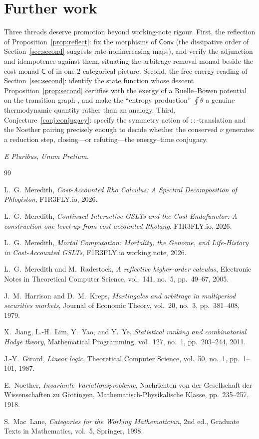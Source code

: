 \documentclass[11pt]{article}
\theoremstyle{definition}
\theoremstyle{plain}
\theoremstyle{remark}
\newcommand{\cost}{\mathsf{C}}
\newcommand{\Conv}{\mathsf{Conv}}
\begin{document}
\section*{Further work}

Three threads deserve promotion beyond working-note rigour.
First, the reflection of Proposition~\ref{prop:reflect}: fix the morphisms of $\Conv$ (the
dissipative order of Section~\ref{sec:second} suggests rate-nonincreasing maps), and verify the
adjunction and idempotence against them, situating the arbitrage-removal monad beside the cost
monad $\cost$ of \cite{CE} in one $2$-categorical picture.
Second, the free-energy reading of Section~\ref{sec:second}: identify the state function whose
descent Proposition~\ref{prop:second} certifies with the exergy of a Ruelle--Bowen potential on the
transition graph \cite{MC}, and make the ``entropy production'' $\oint\theta$ a genuine thermodynamic
quantity rather than an analogy.
Third, Conjecture~\ref{conj:conjugacy}: specify the symmetry action of $::$-translation and the
Noether pairing precisely enough to decide whether the conserved $\nu$ generates a reduction step,
closing---or refuting---the energy--time conjugacy.

\bigskip
\noindent\emph{E Pluribus, Unum Pretium.}

\begin{thebibliography}{99}

 L.~G.~Meredith, \emph{Cost-Accounted Rho Calculus: A Spectral Decomposition of
Phlogiston}, F1R3FLY.io, 2026.

 L.~G.~Meredith, \emph{Continued Interactive GSLTs and the Cost Endofunctor: A
construction one level up from cost-accounted Rholang}, F1R3FLY.io, 2026.

 L.~G.~Meredith, \emph{Mortal Computation: Mortality, the Genome, and Life-History in
Cost-Accounted GSLTs}, F1R3FLY.io working note, 2026.

 L.~G.~Meredith and M.~Radestock, \emph{A reflective higher-order calculus},
Electronic Notes in Theoretical Computer Science, vol.~141, no.~5, pp.~49--67, 2005.

 J.~M.~Harrison and D.~M.~Kreps, \emph{Martingales and arbitrage in multiperiod
securities markets}, Journal of Economic Theory, vol.~20, no.~3, pp.~381--408, 1979.

 X.~Jiang, L.-H.~Lim, Y.~Yao, and Y.~Ye, \emph{Statistical ranking and combinatorial
Hodge theory}, Mathematical Programming, vol.~127, no.~1, pp.~203--244, 2011.

 J.-Y.~Girard, \emph{Linear logic}, Theoretical Computer Science, vol.~50, no.~1,
pp.~1--101, 1987.

 E.~Noether, \emph{Invariante Variationsprobleme}, Nachrichten von der
Gesellschaft der Wissenschaften zu G\"ottingen, Mathematisch-Physikalische Klasse, pp.~235--257,
1918.

 S.~Mac~Lane, \emph{Categories for the Working Mathematician}, 2nd ed., Graduate
Texts in Mathematics, vol.~5, Springer, 1998.

\end{thebibliography}
\end{document}
